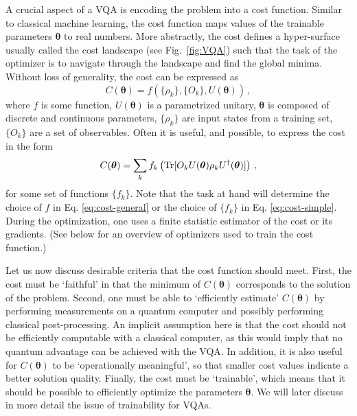 \documentclass[prx,twocolumn,floatfix,superscriptaddress,longbibliography]{revtex4-1}
\renewcommand{\vec}[1]{\boldsymbol{#1}}  %
\newcommand{\<}{\langle}
\renewcommand{\>}{\rangle}
\newcommand{\Tr}{{\rm Tr}}
\renewcommand{\vec}[1]{\boldsymbol{#1}}  %
\newcommand{\ad}{^\dagger}
\begin{document}
A crucial aspect of a VQA is encoding the problem into a cost function. Similar to classical machine learning, the cost function maps values of the trainable parameters $\vec{\theta}$ to real numbers. More abstractly, the cost defines a hyper-surface usually called the cost landscape (see Fig.~\ref{fig:VQA}) such that the task of the optimizer is to navigate through the landscape and find the global minima. Without loss of generality, the cost can be expressed as
\begin{equation}\label{eq:cost-general}
    C(\vec{\theta}) = f\left(\{\rho_k\},\{O_k\},U(\vec{\theta})\right)\,,
\end{equation}
where $f$ is some function, $U(\vec{\theta})$ is a parametrized unitary,  $\vec{\theta}$ is composed of discrete and continuous parameters, $\{\rho_k\}$ are input states from a training set, $\{O_k\}$ are a set of observables. Often it is useful, and possible, to express the cost in the form
\begin{equation}\label{eq:cost-simple}
    C(\vec{\theta}) = \sum_{k}f_k\left(\Tr[O_kU(\vec{\theta})\rho_k U\ad(\vec{\theta})]\right)\,,
\end{equation}
for some set of functions $\{f_k\}$. Note that the task at hand will determine the choice of $f$ in Eq. \eqref{eq:cost-general} or the choice of $\{f_k\}$ in Eq. \eqref{eq:cost-simple}. During the optimization, one uses a finite statistic estimator of the cost or its gradients. (See below  for an overview of optimizers used to train the cost function.)


Let us now discuss desirable criteria that the cost function should meet. First, the cost must be  `faithful' in that the minimum of  $C(\vec{\theta})$ corresponds to the solution of the problem. Second, one must be able to  `efficiently estimate' $C(\vec{\theta})$ by performing measurements on a quantum computer and possibly performing classical post-processing. An implicit assumption here is that  the cost should not  be efficiently computable with a classical computer, as this would imply that no quantum advantage can be achieved with the VQA. In addition, it is also useful for  $C(\vec{\theta})$ to be `operationally meaningful', so that smaller cost values indicate a better solution quality. Finally, the cost must be `trainable', which means that it should be possible to efficiently optimize the parameters $\vec{\theta}$. We will later discuss in more detail the issue of trainability for VQAs.
\end{document}
